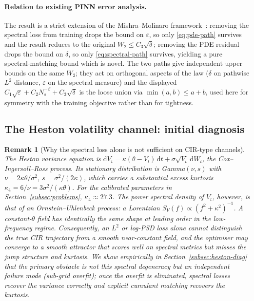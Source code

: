 \documentclass[review,12pt]{elsarticle}
\newtheorem{remark}{Remark}
\begin{document}
\paragraph{Relation to existing PINN error analysis.}
The result is a strict extension of the Mishra--Molinaro
framework~\cite{MishraMolinaro2022}: removing the spectral loss from
training drops the bound on \(\varepsilon\), so only
\eqref{eq:pde-path} survives and the result reduces to the original
\(W_2 \le C_3\sqrt\delta\); removing the PDE residual drops the bound
on \(\delta\), so only \eqref{eq:spectral-path} survives, yielding a
pure spectral-matching bound which is novel. The two paths give
independent upper bounds on the same \(W_2\); they act on orthogonal
aspects of the law (\(\delta\) on pathwise \(L^2\) distance,
\(\varepsilon\) on the spectral measure) and the displayed
\(C_1\sqrt\varepsilon + C_2 N_s^{-\beta} + C_3\sqrt\delta\) is the
loose union via \(\min(a,b)\le a+b\), used here for symmetry with the
training objective rather than for tightness.

\subsection{The Heston volatility channel: initial diagnosis}
\label{subsec:cir-analysis}

\begin{remark}[Why the spectral loss alone is not sufficient on CIR-type channels]
\label{rem:cir}
The Heston variance equation is
\(\mathrm dV_t = \kappa(\theta - V_t)\,\mathrm dt
+ \sigma \sqrt{V_t}\,\mathrm dW_t\), the Cox--Ingersoll--Ross
process. Its stationary distribution is Gamma\((\nu, s)\) with
\(\nu = 2\kappa\theta/\sigma^2\), \(s = \sigma^2/(2\kappa)\),
which carries a substantial excess kurtosis
\(\kappa_4 = 6/\nu = 3\sigma^2/(\kappa\theta)\). For the
calibrated parameters in Section~\ref{subsec:problems},
\(\kappa_4 \approx 27.3\). The power spectral density of
\(V_t\), however, is that of an Ornstein--Uhlenbeck process:
a Lorentzian \(S_V(f) \propto (f^2 + \kappa^2)^{-1}\). A
constant-\(\theta\) field has \emph{identically the same shape}
at leading order in the low-frequency regime. Consequently,
an \(L^2\) or log-PSD loss alone cannot distinguish the true
CIR trajectory from a smooth near-constant field, and the
optimiser may converge to a smooth attractor that scores well
on spectral metrics but misses the jump structure and kurtosis.
We show empirically in Section~\ref{subsec:heston-diag} that
the primary obstacle is not this spectral degeneracy but an
independent failure mode (sub-grid overfit); once the overfit
is eliminated, spectral losses recover the variance correctly
and explicit cumulant matching recovers the kurtosis.
\end{remark}
\end{document}
